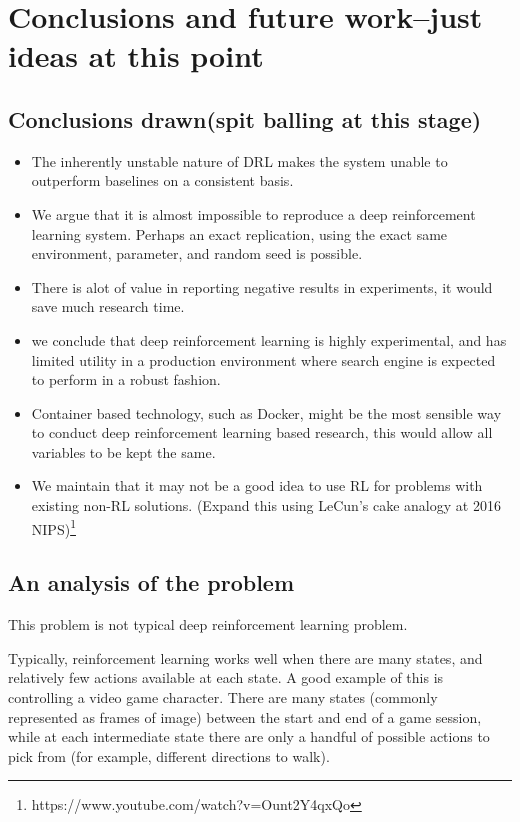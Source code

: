 \chapter{Conclusions and future work--just ideas at this point}
\label{chap:conclusion}


\section{Conclusions drawn(spit balling at this stage)}

\begin{itemize}
	\item The inherently unstable nature of DRL makes the system unable to outperform baselines on a consistent basis.
	\item We argue that it is almost impossible to reproduce a deep reinforcement learning system. Perhaps an exact replication, using the exact same environment, parameter, and random seed is possible. 
	\item There is alot of value in reporting negative results in experiments, it would save much research time. 
	\item we conclude that deep reinforcement learning is highly experimental, and has limited utility in a production environment where search engine is expected to perform in a robust fashion.
	\item Container based technology, such as Docker, might be the most sensible way to conduct deep reinforcement learning based research, this would allow all variables to be kept the same.
	\item We maintain that it may not be a good idea to use RL for problems with existing non-RL solutions. (Expand this using LeCun's cake analogy at 2016 NIPS)\footnote{https://www.youtube.com/watch?v=Ount2Y4qxQo}
\end{itemize}





\section{An analysis of the problem}
This problem is not typical deep reinforcement learning problem. 

Typically, reinforcement learning works well when there are many states, and relatively few actions available at each state. A good example of this is controlling a video game character. There are many states (commonly represented as frames of image) between the start and end of a game session, while at each intermediate state there are only a handful of possible actions to pick from (for example, different directions to walk). 

